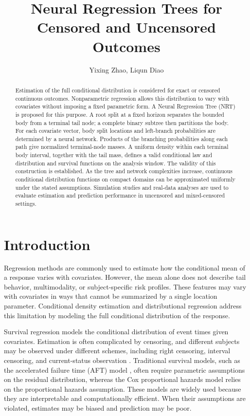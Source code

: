 \documentclass[11pt]{article}
\numberwithin{equation}{section}
\begin{document}
\newcommand{\argmin}{\operatornamewithlimits{argmin}}
\newcommand{\mc}[1]{\mathcal{#1}}

\title{Neural Regression Trees for Censored and Uncensored Outcomes}
\author{Yixing Zhao, Liqun Diao}
\maketitle
\begin{abstract}
Estimation of the full conditional distribution is considered for exact or censored continuous outcomes. Nonparametric regression allows this distribution to vary with covariates without imposing a fixed parametric form. A Neural Regression Tree (NRT) is proposed for this purpose. A root split at a fixed horizon separates the bounded body from a terminal tail node; a complete binary subtree then partitions the body. For each covariate vector, body split locations and left-branch probabilities are determined by a neural network. Products of the branching probabilities along each path give normalized terminal-node masses. A uniform density within each terminal body interval, together with the tail mass, defines a valid conditional law and distribution and survival functions on the analysis window. The validity of this construction is established. As the tree and network complexities increase, continuous conditional distribution functions on compact domains can be approximated uniformly under the stated assumptions. Simulation studies and real-data analyses are used to evaluate estimation and prediction performance in uncensored and mixed-censored settings.
\end{abstract}

\section{Introduction}

Regression methods are commonly used to estimate how the conditional mean of a response varies with covariates. However, the mean alone does not describe tail behavior, multimodality, or subject-specific risk profiles. These features may vary with covariates in ways that cannot be summarized by a single location parameter. Conditional density estimation and distributional regression address this limitation by modeling the full conditional distribution of the response.

Survival regression models the conditional distribution of event times given covariates. Estimation is often complicated by censoring, and different subjects may be observed under different schemes, including right censoring, interval censoring, and current-status observation \citep{lawless_statistical_2003,sun_statistical_2006, kleinbaum_survival_2012}. Traditional survival models, such as the accelerated failure time (AFT) model \citep{lawless_statistical_2003}, often require parametric assumptions on the residual distribution, whereas the Cox proportional hazards model \citep{cox_regression_1972} relies on the proportional hazards assumption. These models are widely used because they are interpretable and computationally efficient. When their assumptions are violated, estimates may be biased and prediction may be poor.
\end{document}
